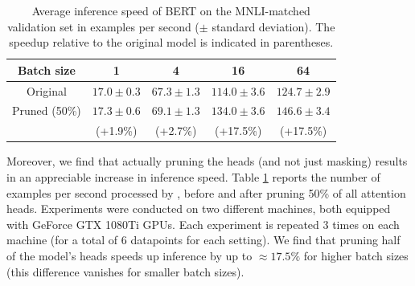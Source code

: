 \begin{table}[!h]
\centering
{\small
\begin{tabular}{c|cccc}
Batch size & 1 & 4 & 16 & 64 \\
\hline\hline
Original & $17.0\pm 0.3$ & $67.3\pm 1.3$ & $114.0\pm 3.6$ & $124.7\pm 2.9$ \\
Pruned (50\%) & $17.3\pm 0.6$ & $69.1\pm 1.3$ & $134.0\pm 3.6$ & $146.6\pm 3.4$ \\
 & (+1.9\%) & (+2.7\%) & (+17.5\%) & (+17.5\%) \\
\hline
\end{tabular}
\caption{\label{tab:pruning_speedup}{\footnotesize Average inference speed of BERT on the MNLI-matched validation set in examples per second ($\pm$ standard deviation). The speedup relative to the original model is indicated in parentheses.}}
}
\end{table}

Moreover, we find that actually pruning the heads (and not just masking) results in an appreciable increase in inference speed. Table \ref{tab:pruning_speedup} reports the number of examples per second processed by \bertmnli{}, before and after pruning 50\% of all attention heads. Experiments were conducted on two different machines, both equipped with GeForce GTX 1080Ti GPUs. Each experiment is repeated 3 times on each machine (for a total of 6 datapoints for each setting).
We find that pruning half of the model's heads speeds up inference by up to $\approx17.5\%$ for higher batch sizes (this difference vanishes for smaller batch sizes).









